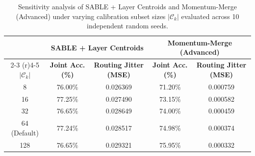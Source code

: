 \documentclass{article}
\theoremstyle{plain}
\theoremstyle{definition}
\theoremstyle{remark}
\begin{document}
    \begin{table}[h]
    \centering
    \caption{Sensitivity analysis of SABLE + Layer Centroids and Momentum-Merge (Advanced) under varying calibration subset sizes $|\mathcal{C}_k|$ evaluated across 10 independent random seeds.}
    \label{tab:calibration_sensitivity_results}
    \vskip 0.1in
    \begin{tabular}{ccccc}
    \toprule
    & \multicolumn{2}{c}{\textbf{SABLE + Layer Centroids}} & \multicolumn{2}{c}{\textbf{Momentum-Merge (Advanced)}} \\
    \cmidrule(r){2-3} \cmidrule(r){4-5}
    $|\mathcal{C}_k|$ & \textbf{Joint Acc. (\%)} & \textbf{Routing Jitter (MSE)} & \textbf{Joint Acc. (\%)} & \textbf{Routing Jitter (MSE)} \\
    \midrule
    8 & 76.00\% & 0.026369 & 71.20\% & 0.000759 \\
    16 & 77.25\% & 0.027490 & 73.15\% & 0.000582 \\
    32 & 76.65\% & 0.028649 & 74.00\% & 0.000459 \\
    64 (Default) & 77.24\% & 0.028517 & 74.98\% & 0.000374 \\
    128 & 76.65\% & 0.029321 & 75.95\% & 0.000332 \\
    \bottomrule
    \end{tabular}
    \end{table}
\end{document}
